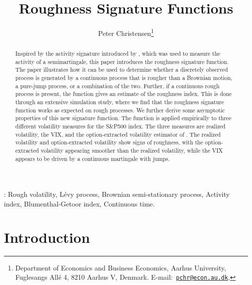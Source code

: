 \documentclass[fleqn,11pt,letterpaper]{article}
\theoremstyle{plain}
\theoremstyle{definition}
\theoremstyle{remark}
\numberwithin{equation}{section}
\begin{document}
\title{Roughness Signature Functions}

\author{
Peter Christensen\thanks{
Department of Economics and Business Economics, 
Aarhus University, 
Fuglesangs All\'e 4,
8210 Aarhus V, Denmark.
E-mail:\
\href{mailto:pchr@econ.au.dk}{\nolinkurl{pchr@econ.au.dk}}. 
}
}

\maketitle
\begin{abstract}
    Inspired by the activity signature introduced by \cite{Todorov2010}, which was used to measure the activity of a semimartingale, this paper introduces the roughness signature function. The paper illustrates how it can be used to determine whether a discretely observed process is generated by a continuous process that is rougher than a Brownian motion, a pure-jump process, or a combination of the two. Further, if a continuous rough process is present, the function gives an estimate of the roughness index. This is done through an extensive simulation study, where we find that the roughness signature function works as expected on rough processes. We further derive some asymptotic properties of this new signature function. The function is applied empirically to three different volatility measures for the S\&P500 index. The three measures are realized volatility, the VIX, and the option-extracted volatility  estimator of \cite{Todorov2019}. The realized volatility and option-extracted volatility show signs of roughness, with the option-extracted volatility appearing smoother than the realized volatility, while the VIX appears to be driven by a continuous martingale with jumps. 

\end{abstract}

\bigskip

:  Rough volatility, Lévy process, Brownian semi-stationary process, Activity index, Blumenthal-Getoor index, Continuous time. \\



\baselineskip=17pt




 
\newpage

\section{Introduction}\label{sec:introduction}
\end{document}

